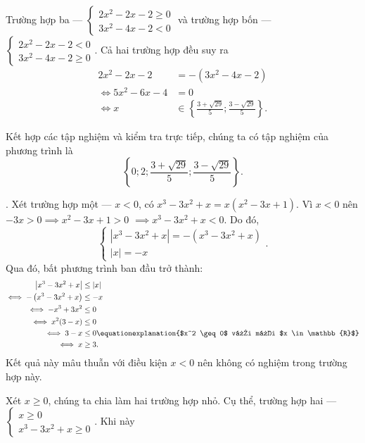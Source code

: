 \textcolor{colorEmphasis}{Trường hợp ba --- $
\begin{cases}
   2x^2 - 2x - 2 \geq 0 \\
   3x^2 - 4x - 2 < 0
\end{cases}$} và \textcolor{colorEmphasis}{trường hợp bốn --- $
\begin{cases}
   2x^2 - 2x - 2 < 0 \\
   3x^2 - 4x - 2 \geq 0
\end{cases}$}. Cả hai trường hợp đều suy ra
\begin{align*}
   2x^2 - 2x - 2 &= -\left(3x^2 - 4x - 2\right) \\
   \iff 5x^2 - 6x - 4 &= 0 \\
   \iff x &\in \left\{\frac{3 + \sqrt{29}}{5}; \frac{3 - \sqrt{29}}{5}\right\}.
\end{align*}

Kết hợp các tập nghiệm và kiểm tra trực tiếp, chúng ta có tập nghiệm của phương trình là $$\left\{0; 2; \frac{3 + \sqrt{29}}{5}; \frac{3 - \sqrt{29}}{5}\right\}.$$

. Xét \textcolor{colorEmphasisCyan}{trường hợp một --- $x < 0$}, có $x^3 - 3x^2 + x = x\left(x^2 - 3x + 1\right)$. Vì $x < 0$ nên $-3x > 0 \implies x^2 - 3x + 1 > 0$ $\implies x^3 - 3x^2 + x < 0$. Do đó,
$$
\begin{cases}
   |x^3 - 3x^2 + x| = -\left(x^3 - 3x^2 + x\right) \\
   |x| = -x
\end{cases}.
$$
Qua đó, bất phương trình ban đầu trở thành:
\begin{align*}
   \left|x^3 - 3x^2 + x\right| &\leq \left|x\right| \\
   \iff -\left(x^3 - 3x^2 + x\right) &\leq -x \\
   \iff -x^3 + 3x^2 &\leq 0 \\
   \iff x^2 (3 - x) &\leq 0 \\
   \iff 3 - x &\leq 0 \equationexplanation{$x^2 \geq 0$ với mọi $x \in \mathbb{R}$} \\
   \iff x &\geq 3.
\end{align*}
Kết quả này mâu thuẫn với điều kiện $x < 0$ nên không có nghiệm trong trường hợp này.

Xét $x \geq 0$, chúng ta chia làm hai trường hợp nhỏ. Cụ thể, \textcolor{colorEmphasis}{trường hợp hai --- $\begin{cases}
   x \geq 0 \\
   x^3 - 3x^2 + x \geq 0
\end{cases}$}. Khi này

